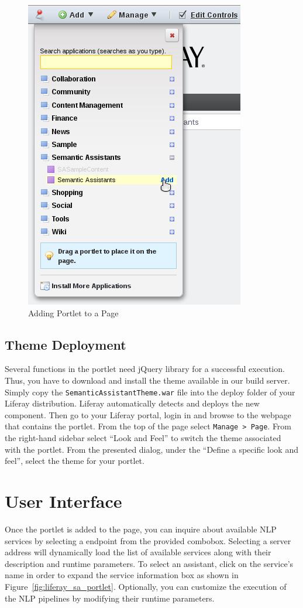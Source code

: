\begin{figure}
\centering
\includegraphics[scale=0.6]{pictures/liferay_add_portlet.png}
\caption{Adding \sa Portlet to a Page}
\label{fig:liferay_add_portlet}
\end{figure}

\subsection{Theme Deployment}
\label{sec:theme_deploy}
Several functions in the \sa portlet need jQuery library for a successful execution. Thus, you have to download and install the \sa theme available in our build server. Simply copy the \texttt{SemanticAssistantTheme.war} file into the deploy folder of your Liferay distribution. Liferay automatically detects and deploys the new component. Then go to your Liferay portal, login in and browse to the webpage that contains the \sa portlet. From the top of the page select \texttt{Manage \textgreater~Page}. From the right-hand sidebar select ``Look and Feel'' to switch the theme associated with the \sa portlet. From the presented dialog, under the ``Define a specific look and feel'', select the \sa theme for your portlet.

\section{User Interface}
Once the portlet is added to the page, you can inquire about available NLP services by selecting a \sa endpoint from the provided combobox. Selecting a server address will dynamically load the list of available services along with their description and runtime parameters. To select an assistant, click on the service's name in order to expand the service information box as shown in Figure~\ref{fig:liferay_sa_portlet}. Optionally, you can customize the execution of the NLP pipelines by modifying their runtime parameters.

